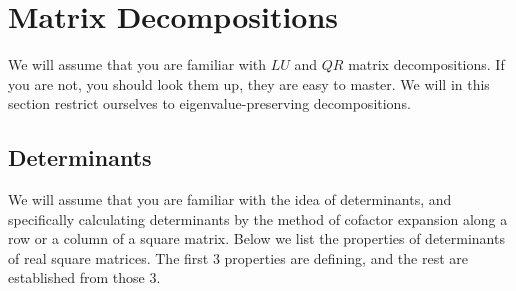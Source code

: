 \documentclass[12pt,oneside]{article}
\begin{document}
\clearpage
\newpage
\section{Matrix Decompositions}
We will assume that you are familiar with $LU$ and $QR$ matrix
decompositions. If you are not, you should look them up, they are easy
to master. We will in this section restrict ourselves to
eigenvalue-preserving decompositions.
\subsection{Determinants}
We will assume that you are familiar with the idea of determinants,
and specifically calculating determinants by the method of cofactor
expansion along a row or a column of a square matrix. Below we list
the properties of determinants of real square matrices. The first 3
properties are defining, and the rest are established from those 3.
\end{document}
